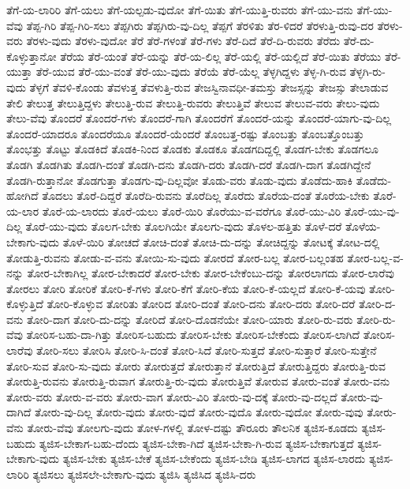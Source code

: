 {ತೆಗೆ-ಯ-ಲಾರಿರಿ
ತೆಗೆ-ಯಲು
ತೆಗೆ-ಯಲ್ಪಡು-ವುದೋ
ತೆಗೆ-ಯಿತು
ತೆಗೆ-ಯುತ್ತಿ-ರುವರು
ತೆಗೆ-ಯು-ವನು
ತೆಗೆ-ಯು-ವೆವು
ತೆಪ್ಪ-ಗಿರಿ
ತೆಪ್ಪ-ಗಿರಿ-ಸಲು
ತೆಪ್ಪಗಿರು
ತೆಪ್ಪಗಿರು-ವು-ದಿಲ್ಲ
ತೆಪ್ಪಗೆ
ತೆರಳಿತು
ತೆರ-ಳಿದರೆ
ತೆರಳುತ್ತಿ-ರುವು-ದರ
ತೆರಳು-ವರು
ತೆರಳು-ವುದು
ತೆರಳು-ವುದೋ
ತೆರೆ
ತೆರೆ-ಗಳಂತೆ
ತೆರೆ-ಗಳು
ತೆರೆ-ದಿದೆ
ತೆರೆ-ದಿ-ರುವರು
ತೆರೆದು
ತೆರೆ-ದು-ಕೊಳ್ಳುತ್ತಾನೋ
ತೆರೆಯ
ತೆರೆ-ಯಂತೆ
ತೆರೆ-ಯನ್ನು
ತೆರೆ-ಯ-ಲಿಲ್ಲ
ತೆರೆ-ಯಲ್ಲಿ
ತೆರೆ-ಯಲ್ಲಿದೆ
ತೆರೆ-ಯಿತು
ತೆರೆಯು
ತೆರೆ-ಯುತ್ತಾ
ತೆರೆ-ಯುವ
ತೆರೆ-ಯು-ವಂತೆ
ತೆರೆ-ಯು-ವುದು
ತೆರೆಯೆ
ತೆರೆ-ಯೆಲ್ಲ
ತೆಳ್ಳಗಿದ್ದಳು
ತೆಳ್ಳ-ಗಿ-ರುವ
ತೆಳ್ಳಗಿ-ರು-ವುದು
ತೆಳ್ಳಗೆ
ತೆವಳಿ-ಕೊಂಡು
ತೆವಳುತ್ತ
ತೆವಳುತ್ತಿ-ರುವ
ತೇಜಸ್ವಿನಾವಧೀ-ತಮಸ್ತು
ತೇಜಸ್ಸನ್ನು
ತೇಜಸ್ಸು
ತೇಲಾಡುವ
ತೇಲಿ
ತೇಲುತ್ತ
ತೇಲುತ್ತಿದ್ದಳು
ತೇಲುತ್ತಿ-ರುವ
ತೇಲುತ್ತಿ-ರುವರು
ತೇಲುತ್ತಿವೆ
ತೇಲುವ
ತೇಲುವ-ವರು
ತೇಲು-ವುದು
ತೇಲು-ವೆವು
ತೊಂದರೆ
ತೊಂದರೆ-ಗಳು
ತೊಂದರೆ-ಗಾಗಿ
ತೊಂದರೆಗೆ
ತೊಂದರೆ-ಯನ್ನು
ತೊಂದರೆ-ಯಾಗು-ವು-ದಿಲ್ಲ
ತೊಂದರೆ-ಯಾದರೂ
ತೊಂದರೆಯೂ
ತೊಂದರೆ-ಯೆಂದರೆ
ತೊಂಬತ್ತ-ರಷ್ಟು
ತೊಂಬತ್ತು
ತೊಂಬತ್ತೊಂಬತ್ತು
ತೊಂಭತ್ತು
ತೊಟ್ಟು
ತೊಡಕಿದೆ
ತೊಡಕಿ-ನಿಂದ
ತೊಡಕು
ತೊಡಕೂ
ತೊಡಗದಿದ್ದಲ್ಲಿ
ತೊಡಗ-ಬೇಕು
ತೊಡಗಲೂ
ತೊಡಗಿ
ತೊಡಗಿತು
ತೊಡಗಿ-ದಂತೆ
ತೊಡಗಿ-ದನು
ತೊಡಗಿ-ದರು
ತೊಡಗಿ-ದರೆ
ತೊಡಗಿ-ದಾಗ
ತೊಡಗಿದ್ದೇನೆ
ತೊಡಗಿ-ರುತ್ತಾನೋ
ತೊಡಗುತ್ತಾ
ತೊಡಗು-ವು-ದಿಲ್ಲವೋ
ತೊಡು-ವರು
ತೊಡು-ವುದು
ತೊಡೆದು-ಹಾಕಿ
ತೊಡೆದು-ಹೋಗಿದೆ
ತೊದಲು
ತೊರೆ-ದಿದ್ದರೆ
ತೊರೆದಿ-ರುವನು
ತೊರೆದಿಲ್ಲ
ತೊರೆದು
ತೊರೆಯ-ದಂತೆ
ತೊರೆಯ-ಬೇಕು
ತೊರೆ-ಯ-ಲಾರ
ತೊರೆ-ಯ-ಲಾರದು
ತೊರೆ-ಯಲು
ತೊರೆ-ಯಿರಿ
ತೊರೆಯು-ವ-ವರೆಗೂ
ತೊರೆ-ಯು-ವಿರಿ
ತೊರೆ-ಯು-ವು-ದಿಲ್ಲ
ತೊರೆ-ಯು-ವುದು
ತೊಲಗ-ಬೇಕು
ತೊಲಗಿಯೇ
ತೊಲಗು-ವುದು
ತೊಳಲ-ಹತ್ತಿತು
ತೊಳೆ-ದರೆ
ತೊಳೆಯ-ಬೇಕಾಗು-ವುದು
ತೊಳೆ-ಯಿರಿ
ತೋಚದೆ
ತೋಚಿ-ದಂತೆ
ತೋಚಿ-ದು-ದನ್ನು
ತೋಚಿದ್ದನ್ನು
ತೋಟಕ್ಕೆ
ತೋಟ-ದಲ್ಲಿ
ತೋಡುತ್ತಿ-ರುವನು
ತೋಡು-ವ-ವನು
ತೋಯಿ-ಸು-ವುದು
ತೋರದೆ
ತೋರ-ಬಲ್ಲ
ತೋರ-ಬಲ್ಲಂತಹ
ತೋರ-ಬಲ್ಲ-ವ-ನನ್ನು
ತೋರ-ಬೇಕಾಗಿಲ್ಲ
ತೋರ-ಬೇಕಾದರೆ
ತೋರ-ಬೇಕು
ತೋರ-ಬೇಕೆಂಬು-ದನ್ನು
ತೋರಲಾಗದು
ತೋರ-ಲಾರೆವು
ತೋರಲು
ತೋರಿ
ತೋರಿಕೆ
ತೋರಿ-ಕೆ-ಗಳು
ತೋರಿ-ಕೆಗೆ
ತೋರಿ-ಕೆಯ
ತೋರಿ-ಕೆ-ಯಲ್ಲದೆ
ತೋರಿ-ಕೆ-ಯವು
ತೋರಿ-ಕೊಳ್ಳುತ್ತಿದೆ
ತೋರಿ-ಕೊಳ್ಳುವ
ತೋರಿತು
ತೋರಿದ
ತೋರಿ-ದಂತೆ
ತೋರಿ-ದನು
ತೋರಿ-ದರು
ತೋರಿ-ದರೆ
ತೋರಿ-ದ-ವನು
ತೋರಿ-ದಾಗ
ತೋರಿ-ದು-ದನ್ನು
ತೋರಿದೆ
ತೋರಿ-ದೊಡನೆಯೇ
ತೋರಿ-ಯಾರು
ತೋರಿ-ರು-ವರು
ತೋರಿ-ರು-ವೆವು
ತೋರಿಸ-ಬಹು-ದಾ-ಗಿತ್ತು
ತೋರಿಸ-ಬಹುದು
ತೋರಿಸ-ಬೇಕು
ತೋರಿಸ-ಬೇಕೆಂದು
ತೋರಿಸ-ಲಾಗಿದೆ
ತೋರಿಸ-ಲಾರೆವು
ತೋರಿ-ಸಲು
ತೋರಿಸಿ
ತೋರಿ-ಸಿ-ದಂತೆ
ತೋರಿ-ಸಿದೆ
ತೋರಿ-ಸುತ್ತದೆ
ತೋರಿ-ಸುತ್ತಾರೆ
ತೋರಿ-ಸುತ್ತೇನೆ
ತೋರಿ-ಸುವ
ತೋರಿ-ಸು-ವುದು
ತೋರು
ತೋರುತ್ತದೆ
ತೋರುತ್ತಾನೆ
ತೋರುತ್ತಿದೆ
ತೋರುತ್ತಿದ್ದರು
ತೋರುತ್ತಿ-ರುವ
ತೋರುತ್ತಿ-ರುವನು
ತೋರುತ್ತಿ-ರುವಾಗ
ತೋರುತ್ತಿ-ರು-ವುದು
ತೋರುತ್ತಿವೆ
ತೋರುವ
ತೋರು-ವಂತೆ
ತೋರು-ವನು
ತೋರು-ವರು
ತೋರು-ವ-ವರು
ತೋರು-ವಾಗ
ತೋರು-ವಿರಿ
ತೋರು-ವು-ದಕ್ಕೆ
ತೋರು-ವು-ದಲ್ಲದೆ
ತೋರು-ವು-ದಾಗಿದೆ
ತೋರು-ವು-ದಿಲ್ಲ
ತೋರು-ವುದು
ತೋರು-ವುದೆ
ತೋರು-ವುದೊ
ತೋರು-ವುದೋ
ತೋರು-ವುವು
ತೋರು-ವೆನು
ತೋರು-ವೆವು
ತೋಲಗು-ವುದು
ತೋಳ-ಗಳಲ್ಲಿ
ತೋಳ-ದಷ್ಟು
ತೌರೂರು
ತೌಲನಿಕ
ತ್ಯಜಿಸ-ಕೂಡದು
ತ್ಯಜಿಸ-ಬಹುದು
ತ್ಯಜಿಸ-ಬೇಕಾಗ-ಬಹು-ದೆಂದು
ತ್ಯಜಿಸ-ಬೇಕಾ-ಗಿದೆ
ತ್ಯಜಿಸ-ಬೇಕಾ-ಗಿ-ರುವ
ತ್ಯಜಿಸ-ಬೇಕಾಗುತ್ತದೆ
ತ್ಯಜಿಸ-ಬೇಕಾಗು-ವುದು
ತ್ಯಜಿಸ-ಬೇಕು
ತ್ಯಜಿಸ-ಬೇಕೆ
ತ್ಯಜಿಸ-ಬೇಕೆಂದು
ತ್ಯಜಿಸ-ಬೇಡಿ
ತ್ಯಜಿಸ-ಲಾಗದ
ತ್ಯಜಿಸ-ಲಾರದು
ತ್ಯಜಿಸ-ಲಾರಿರಿ
ತ್ಯಜಿಸಲು
ತ್ಯಜಿಸಲೇ-ಬೇಕಾಗು-ವುದು
ತ್ಯಜಿಸಿ
ತ್ಯಜಿಸಿದ
ತ್ಯಜಿಸಿ-ದರು
}
